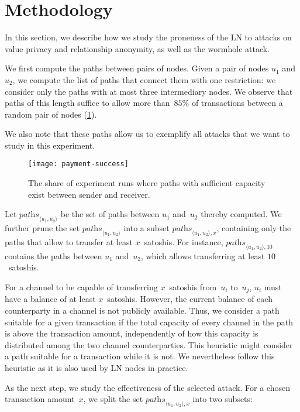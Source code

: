\section{Methodology}
In this section, we describe how we study the proneness of the LN to attacks on value privacy and relationship anonymity, as well as the wormhole attack.

We first compute the paths between pairs of nodes.
Given a pair of nodes $u_1$ and~$u_2$, we compute the list of paths that connect them with one restriction: we consider only the paths with at most three intermediary nodes.
We observe that paths of this length suffice to allow more than~$85\%$ of transactions between a random pair of nodes (\cref{fig:payment-success}).

We also note that these paths allow us to exemplify all attacks that we want to study in this experiment.
\begin{figure}
	\centering
	\texttt{[image: payment-success]}
	\caption{The share of experiment runs where paths with sufficient capacity exist between sender and receiver.}
	\label{fig:payment-success}
\end{figure}

Let $\textit{paths}_{\langle u_1, u_2 \rangle}$ be the set of paths between $u_1$ and~$u_2$ thereby computed.
We further prune the set $\textit{paths}_{\langle u_1, u_2 \rangle}$ into a subset $\textit{paths}_{\langle u_1, u_2 \rangle, x}$, containing only the paths that allow to transfer at least $x$~satoshis.
For instance, $\textit{paths}_{\langle u_1, u_2 \rangle, 10}$ contains the paths between $u_1$ and~$u_2$, which allows transferring at least $10$~satoshis.

For a channel to be capable of transferring $x$~satoshis from~$u_i$ to~$u_j$, $u_i$ must have a balance of at least $x$~satoshis.
However, the current balance of each counterparty in a channel is not publicly available.
Thus, we consider a path suitable for a given transaction if the total capacity of every channel in the path is above the transaction amount, independently of how this capacity is distributed among the two channel counterparties.
This heuristic might consider a path suitable for a transaction while it is not.
We nevertheless follow this heuristic as it is also used by LN nodes in practice.

As the next step, we study the effectiveness of the selected attack.
For a chosen transaction amount~$x$, we split the set $\textit{paths}_{\langle u_1, u_2 \rangle, x}$ into two subsets:

